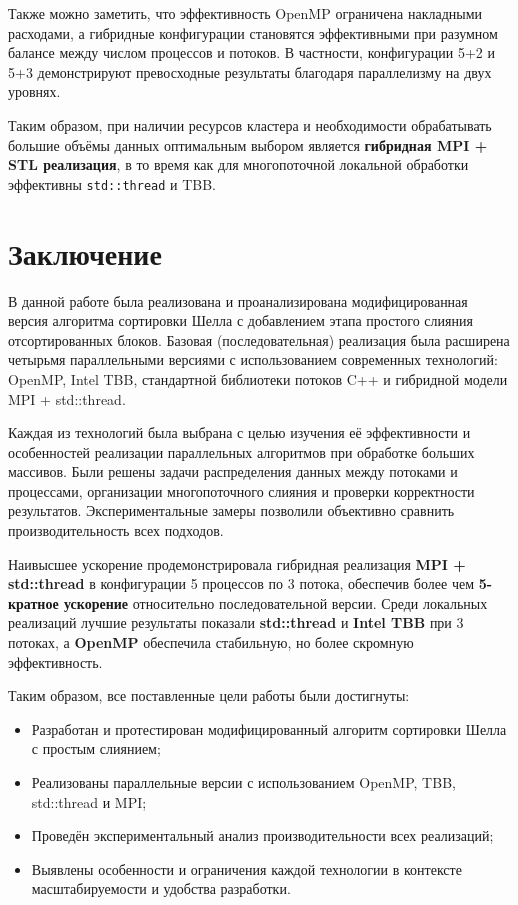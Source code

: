 \documentclass[12pt]{article}
\begin{document}
\hspace*{1.25em}Также можно заметить, что эффективность OpenMP ограничена накладными расходами, а гибридные конфигурации становятся эффективными при разумном балансе между числом процессов и потоков. В частности, конфигурации 5+2 и 5+3 демонстрируют превосходные результаты благодаря параллелизму на двух уровнях.

\hspace*{1.25em}Таким образом, при наличии ресурсов кластера и необходимости обрабатывать большие объёмы данных оптимальным выбором является \textbf{гибридная MPI + STL реализация}, в то время как для многопоточной локальной обработки эффективны \texttt{std::thread} и TBB.
\section{Заключение}

\hspace*{1.25em}В данной работе была реализована и проанализирована модифицированная версия алгоритма сортировки Шелла с добавлением этапа простого слияния отсортированных блоков. Базовая (последовательная) реализация была расширена четырьмя параллельными версиями с использованием современных технологий: OpenMP, Intel TBB, стандартной библиотеки потоков C++ и гибридной модели MPI + std::thread.

\hspace*{1.25em}Каждая из технологий была выбрана с целью изучения её эффективности и особенностей реализации параллельных алгоритмов при обработке больших массивов. Были решены задачи распределения данных между потоками и процессами, организации многопоточного слияния и проверки корректности результатов. Экспериментальные замеры позволили объективно сравнить производительность всех подходов.

\hspace*{1.25em}Наивысшее ускорение продемонстрировала гибридная реализация \textbf{MPI + std::thread} в конфигурации 5 процессов по 3 потока, обеспечив более чем \textbf{5-кратное ускорение} относительно последовательной версии. Среди локальных реализаций лучшие результаты показали \textbf{std::thread} и \textbf{Intel TBB} при 3 потоках, а \textbf{OpenMP} обеспечила стабильную, но более скромную эффективность.

\hspace*{1.25em}Таким образом, все поставленные цели работы были достигнуты:
\begin{itemize}
  \item Разработан и протестирован модифицированный алгоритм сортировки Шелла с простым слиянием;
  \item Реализованы параллельные версии с использованием OpenMP, TBB, std::thread и MPI;
  \item Проведён экспериментальный анализ производительности всех реализаций;
  \item Выявлены особенности и ограничения каждой технологии в контексте масштабируемости и удобства разработки.
\end{itemize}
\end{document}
